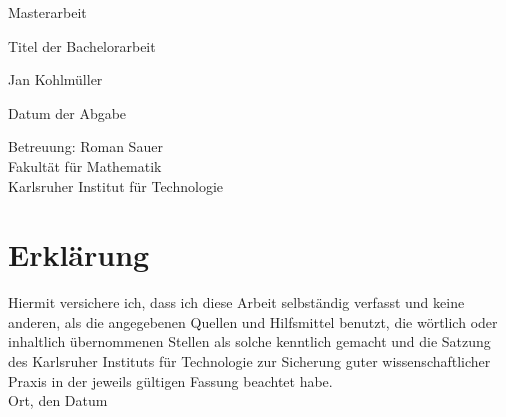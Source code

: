 \documentclass[12pt,a4paper]{scrartcl}
\numberwithin{equation}{section}
\newcommand{\2}{\mathbb{Z} / 2 \mathbb{Z}}
\begin{document}
	\pagestyle{empty}
	\begin{titlepage}

 \begin{center} \large 
		
		Masterarbeit
		\vspace*{2cm}

		{\huge Titel der Bachelorarbeit}
		\vspace*{2.5cm}

		Jan Kohlmüller
		\vspace*{1.5cm}

		Datum der Abgabe
		\vspace*{4.5cm}


		Betreuung: Roman Sauer \\[1cm]
		Fakultät für Mathematik \\[1cm]
		Karlsruher Institut für Technologie
	\end{center}
\end{titlepage}

\tableofcontents

\newpage
 
\pagestyle{headings}




\newpage

\section*{Erklärung}

Hiermit versichere ich, dass ich diese Arbeit selbständig verfasst und keine anderen, als die angegebenen Quellen und Hilfsmittel benutzt, die wörtlich oder inhaltlich übernommenen Stellen als solche kenntlich gemacht und die Satzung des Karlsruher Instituts für Technologie zur Sicherung guter wissenschaftlicher Praxis in der jeweils gültigen Fassung beachtet habe. \\[2ex] 

\noindent
Ort, den Datum\\[5ex]
\end{document}
